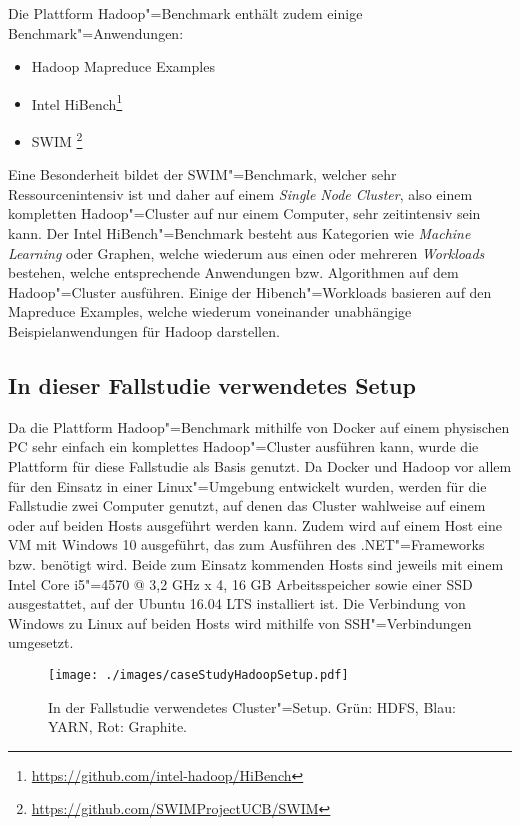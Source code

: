 Die Plattform Hadoop"=Benchmark enthält zudem einige Benchmark"=Anwendungen:

\begin{itemize}
    \item Hadoop Mapreduce Examples
    \item Intel HiBench\footnote{\url{https://github.com/intel-hadoop/HiBench}}
    \item \ac{SWIM} \footnote{\url{https://github.com/SWIMProjectUCB/SWIM}}
\end{itemize}

Eine Besonderheit bildet der SWIM"=Benchmark, welcher sehr Ressourcenintensiv ist und daher auf einem \emph{Single Node Cluster}, also einem kompletten Hadoop"=Cluster auf nur einem Computer, sehr zeitintensiv sein kann.
Der Intel HiBench"=Benchmark besteht aus Kategorien wie \emph{Machine Learning} oder Graphen, welche wiederum aus einen oder mehreren \emph{Workloads} bestehen, welche entsprechende Anwendungen bzw. Algorithmen auf dem Hadoop"=Cluster ausführen.
Einige der Hibench"=Workloads basieren auf den Mapreduce Examples, welche wiederum voneinander unabhängige Beispielanwendungen für Hadoop darstellen.

\subsection{In dieser Fallstudie verwendetes Setup}\label{sec:clusterFallstudie}

Da die Plattform Hadoop"=Benchmark mithilfe von Docker auf einem physischen PC sehr einfach ein komplettes Hadoop"=Cluster ausführen kann, wurde die Plattform für diese Fallstudie als Basis genutzt.
Da Docker und Hadoop vor allem für den Einsatz in einer Linux"=Umgebung entwickelt wurden, werden für die Fallstudie zwei Computer genutzt, auf denen das Cluster wahlweise auf einem oder auf beiden Hosts ausgeführt werden kann.
Zudem wird auf einem Host eine VM mit Windows 10 ausgeführt, das zum Ausführen des .NET"=Frameworks bzw. \sS benötigt wird.
Beide zum Einsatz kommenden Hosts sind jeweils mit einem Intel Core i5"=4570 @ 3,2 GHz x 4, 16 GB Arbeitsspeicher sowie einer SSD ausgestattet, auf der Ubuntu 16.04 LTS installiert ist.
Die Verbindung von Windows zu Linux auf beiden Hosts wird mithilfe von SSH"=Verbindungen umgesetzt.

\begin{figure}
    \texttt{[image: ./images/caseStudyHadoopSetup.pdf]}
    \caption[In der Fallstudie verwendetes Cluster"=Setup]
    {In der Fallstudie verwendetes Cluster"=Setup.
        Grün: \ac{HDFS}, Blau: YARN, Rot: Graphite.}
    \label{fig:caseStudyHadoopSetup}
\end{figure}

